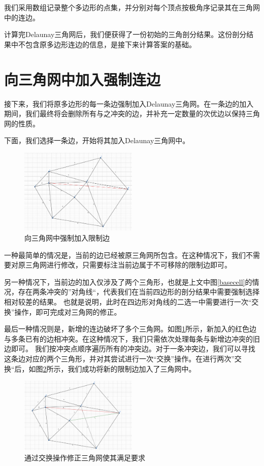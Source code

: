 我们采用数组记录整个多边形的点集，并分别对每个顶点按极角序记录其在三角网中的连边。

计算完Delaunay三角网后，我们便获得了一份初始的三角剖分结果。这份剖分结果中不包含原多边形连边的信息，是接下来计算答案的基础。
\section{向三角网中加入强制连边}
接下来，我们将原多边形的每一条边强制加入Delaunay三角网。在一条边的加入期间，我们最终将会删除所有与之冲突的边，并补充一定数量的次优边以保持三角网的性质。

下面，我们选择一条边，开始将其加入Delaunay三角网中。

\begin{figure}[htp]
    \centering
    \includegraphics[width=0.5\textwidth]
    {figures/addconstrant.png}
    \caption{向三角网中强制加入限制边}
    \label{addedge}
  \end{figure}

一种最简单的情况是，当前的边已经被原三角网所包含。在这种情况下，我们不需要对原三角网进行修改，只需要标注当前边属于不可移除的限制边即可。

另一种情况下，当前边的加入仅涉及了两个三角形，也就是上文中图\ref*{basecell}的情况，存在两条冲突的”对角线“，代表我们在当前四边形的剖分结果中需要强制选择相对较差的结果。
也就是说明，此时在四边形对角线的二选一中需要进行一次“交换”操作，即可完成对三角网的修正。

最后一种情况则是，新增的连边破坏了多个三角网。如图\ref*{addedge}所示，新加入的红色边与多条已有的边相冲突。在这种情况下，我们只需依次处理每条与新增边冲突的旧边即可。
我们按冲突点顺序遍历所有的冲突边。对于一条冲突边，我们可以寻找这条边对应的两个三角形，并对其尝试进行一次“交换”操作。在进行两次”交换“后，如图\ref*{swap}所示，我们成功将新的限制边加入了三角网中。

\begin{figure}[htp]
    \centering
    \includegraphics[width=0.5\textwidth]
    {figures/swap.png}
    \caption{通过交换操作修正三角网使其满足要求}
    \label{swap}
  \end{figure}

